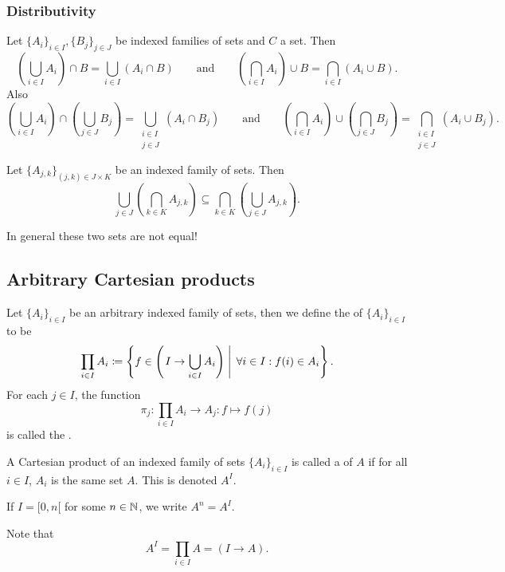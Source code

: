 \subsubsection{Distributivity}
\begin{lemma} \label{lemma:setDistributivity}
Let $\{A_{i}\}_{i \in I}, \{B_{j}\}_{j \in J}$ be indexed families of sets and $C$ a set. Then
\[ \left(\bigcup_{i\in I}A_i\right)\cap B = \bigcup_{i\in I}(A_i\cap B) \qquad\text{and}\qquad \left(\bigcap_{i\in I}A_i\right)\cup B = \bigcap_{i\in I}(A_i\cup B). \]
Also
\[ \left(\bigcup_{i\in I}A_i\right)\cap \left(\bigcup_{j\in J}B_j\right) = \bigcup_{\substack{i\in I\\j\in J}}(A_i\cap B_j) \qquad\text{and}\qquad \left(\bigcap_{i\in I}A_i\right)\cup \left(\bigcap_{j\in J}B_j\right) = \bigcap_{\substack{i\in I\\j\in J}}(A_i\cup B_j). \]
\end{lemma}

\begin{lemma}
Let $\{A_{j,k}\}_{(j,k) \in J\times K}$ be an indexed family of sets. Then
\[ \bigcup_{j\in J}\left(\bigcap_{k\in K}A_{j,k}\right) \subseteq \bigcap_{k\in K}\left(\bigcup_{j\in J}A_{j,k}\right). \]
\end{lemma}
In general these two sets are not equal!


\subsection{Arbitrary Cartesian products}
\begin{definition}
Let $\{A_i\}_{i\in I}$ be an arbitrary indexed family of sets, then we define the  of $\{A_i\}_{i\in I}$ to be
\[ \prod_{i\in I}A_i \coloneqq \left\{ f\in \left(\left. I \to \bigcup_{i\in I}A_i \right) \; \right| \; \forall i\in I: f(i) \in A_i \right\}. \]
For each $j\in I$, the function
\[ \pi_j : \prod_{i\in I}A_i \to A_j: f\mapsto f(j) \]
is called the .
\end{definition}

\begin{definition}
A Cartesian product of an indexed family of sets $\{A_i\}_{i\in I}$ is called a  of $A$ if for all $i\in I$, $A_i$ is the same set $A$. This is denoted $A^I$.
\end{definition}
If $I = [0,n[$ for some $n\in \mathbb{N}$, we write $A^n = A^I$.

Note that
\[ A^I = \prod_{i\in I} A = (I\to A).  \]


